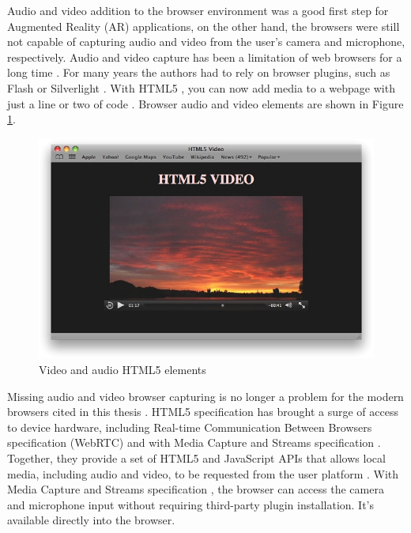 Audio and video addition to the browser environment was a good first step for Augmented Reality (AR) applications, on the other hand, the browsers were still not capable of capturing audio and video from the user's camera and microphone, respectively. Audio and video capture has been a limitation of web browsers for a long time \cite{Hickson2013}. For many years the authors had to rely on browser plugins, such as Flash \cite{Flash2013} or Silverlight \cite{Silverlight2013} \cite{Rocks2013}. With HTML5 \cite{Hickson2013}, you can now add media to a webpage with just a line or two of code \cite{WebKit2013}. Browser audio and video elements \cite{Hickson2013} are shown in Figure \ref{figure:html5_audio_video}.

\begin{figure}[!htb]
  \centering
  \includegraphics[width=380pt]{chapters/basic_concepts/html5_audio_video.png}
  \caption{Video and audio HTML5 elements \cite{WebKit2013}}
  \label{figure:html5_audio_video}
\end{figure}

Missing audio and video browser capturing is no longer a problem for the modern browsers cited in this thesis \cite{WebRTC2013} \cite{Hickson2013}. HTML5 specification \cite{Hickson2013} has brought a surge of access to device hardware, including Real-time Communication Between Browsers specification (WebRTC) \cite{WebRTC2013} and with Media Capture and Streams specification \cite{MediaCapture2013}. Together, they provide a set of HTML5 \cite{Hickson2013} and JavaScript APIs \cite{WebRTC2013} that allows local media, including audio and video, to be requested from the user platform \cite{WC2006}. With Media Capture and Streams specification \cite{MediaCapture2013}, the browser can access the camera and microphone input without requiring third-party plugin installation. It's available directly into the browser.

